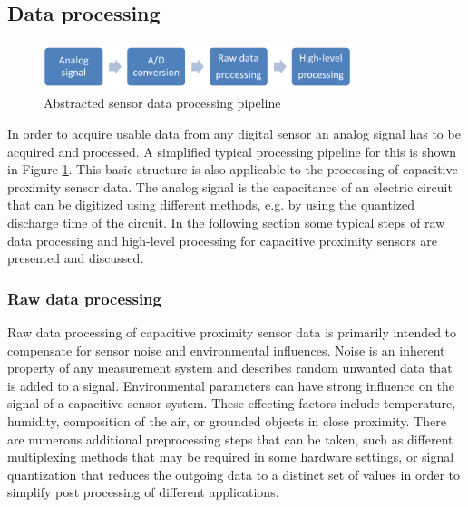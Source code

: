 \subsection{Data processing}
\begin{figure}[h]
\centering
\includegraphics[width=0.8\textwidth]{images/proc_pipe}
\caption{Abstracted sensor data processing pipeline}
\label{fig:rel_proc_pipe}
\end{figure} 
In order to acquire usable data from any digital sensor an analog signal has to be acquired and processed. A simplified typical processing pipeline for this is shown in Figure \ref{fig:rel_proc_pipe}. This basic structure is also applicable to the processing of capacitive proximity sensor data. The analog signal is the capacitance of an electric circuit that can be digitized using different methods, e.g. by using the quantized discharge time of the circuit. In the following section some typical steps of raw data processing and high-level processing for capacitive proximity sensors are presented and discussed.
 
\subsubsection{Raw data processing}
Raw data processing of capacitive proximity sensor data is primarily intended to compensate for sensor noise and environmental influences. Noise is an inherent property of any measurement system and describes random unwanted data that is added to a signal. Environmental parameters can have strong influence on the signal of a capacitive sensor system. These effecting factors include temperature, humidity, composition of the air, or grounded objects in close proximity. There are numerous additional preprocessing steps that can be taken, such as different multiplexing methods that may be required in some hardware settings, or signal quantization that reduces the outgoing data to a distinct set of values in order to simplify post processing of different applications. 

